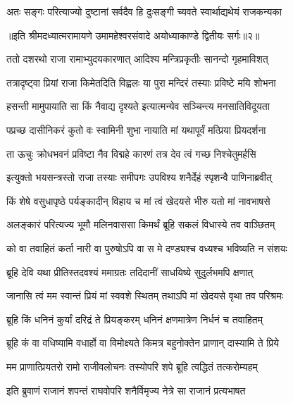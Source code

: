 \twolineshloka
{अतः सङ्गः परित्याज्यो दुष्टानां सर्वदैव हि}
{दुःसङ्गी च्यवते स्वार्थाद्यथेयं राजकन्यका} %

{॥इति श्रीमदध्यात्मरामायणे उमामहेश्वरसंवादे
अयोध्याकाण्डे द्वितीयः सर्गः॥२॥
}




\twolineshloka
{ततो दशरथो राजा रामाभ्युदयकारणात्}
{आदिश्य मन्त्रिप्रकृतीः सानन्दो गृहमाविशत्} %

\twolineshloka
{तत्रादृष्ट्वा प्रियां राजा किमेतदिति विह्वलः}
{या पुरा मन्दिरं तस्याः प्रविष्टे मयि शोभना} %

\twolineshloka
{हसन्ती मामुपायाति सा किं नैवाद्य दृश्यते}
{इत्यात्मन्येव सञ्चिन्त्य मनसातिविदूयता} %

\twolineshloka
{पप्रच्छ दासीनिकरं कुतो वः स्वामिनी शुभा}
{नायाति मां यथापूर्वं मत्प्रिया प्रियदर्शना} %

\twolineshloka
{ता ऊचुः क्रोधभवनं प्रविष्टा नैव विद्महे}
{कारणं तत्र देव त्वं गच्छ निश्चेतुमर्हसि} %

\twolineshloka
{इत्युक्तो भयसन्त्रस्तो राजा तस्याः समीपगः}
{उपविश्य शनैर्देहं स्पृशन्वै पाणिनाब्रवीत्} %

\twolineshloka
{किं शेषे वसुधापृष्ठे पर्यङ्कादीन् विहाय च}
{मां त्वं खेदयसे भीरु यतो मां नावभाषसे} %

\twolineshloka
{अलङ्कारं परित्यज्य भूमौ मलिनवाससा}
{किमर्थं ब्रूहि सकलं विधास्ये तव वाञ्छितम्} %

\twolineshloka
{को वा तवाहितं कर्ता नारी वा पुरुषोऽपि वा}
{स मे दण्ड्यश्च वध्यश्च भविष्यति न संशयः} %

\twolineshloka
{ब्रूहि देवि यथा प्रीतिस्तदवश्यं ममाग्रतः}
{तदिदानीं साधयिष्ये सुदुर्लभमपि क्षणात्} %

\twolineshloka
{जानासि त्वं मम स्वान्तं प्रियं मां स्ववशे स्थितम्}
{तथाऽपि मां खेदयसे वृथा तव परिश्रमः} %

\twolineshloka
{ब्रूहि किं धनिनं कुर्यां दरिद्रं ते प्रियङ्करम्}
{धनिनं क्षणमात्रेण निर्धनं च तवाहितम्} %

\twolineshloka
{ब्रूहि कं वा वधिष्यामि वधार्हो वा विमोक्ष्यते}
{किमत्र बहुनोक्तेन प्राणान् दास्यामि ते प्रिये} %

\twolineshloka
{मम प्राणात्प्रियतरो रामो राजीवलोचनः}
{तस्योपरि शपे ब्रूहि त्वद्धितं तत्करोम्यहम्} %

\twolineshloka
{इति ब्रुवाणं राजानं शपन्तं राघवोपरि}
{शनैर्विमृज्य नेत्रे सा राजानं प्रत्यभाषत} %

